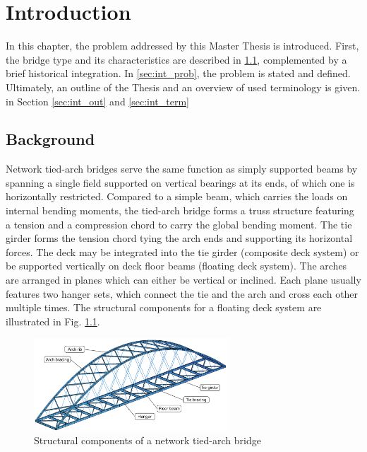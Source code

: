 \chapter{Introduction}\label{sec:intro}
In this chapter, the problem addressed by this Master Thesis is introduced. First, the bridge type and its characteristics are described in \cref{sec:int_back}, complemented by a brief historical integration. In \cref{sec:int_prob}, the problem is stated and defined. Ultimately, an outline of the Thesis and an overview of used terminology is given. in Section \ref{sec:int_out} and \ref{sec:int_term} 

\section{Background}\label{sec:int_back}
Network tied-arch bridges serve the same function as simply supported beams by spanning a single field supported on vertical bearings at its ends, of which one is horizontally restricted. Compared to a simple beam, which carries the loads on internal bending moments, the tied-arch bridge forms a truss structure featuring a tension and a compression chord to carry the global bending moment. The tie girder forms the tension chord tying the arch ends and supporting its horizontal forces. The deck may be integrated into the tie girder (composite deck system) or be supported vertically on deck floor beams (floating deck system). The arches are arranged in planes which can either be vertical or inclined. Each plane usually features two hanger sets, which connect the tie and the arch and cross each other multiple times. The structural components for a floating deck system are illustrated in Fig. \ref{fig:components_illustration}.
\begin{figure}[H]
    \centering
    \includegraphics[width=0.65\textwidth]{overleaf/Pictures/illustration_components.PNG}
    \caption{Structural components of a network tied-arch bridge}
    \label{fig:components_illustration}
\end{figure}

